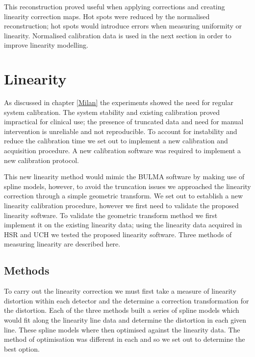 This reconstruction proved useful when applying corrections and creating linearity correction maps. Hot spots were reduced by the normalised reconstruction; hot spots would introduce errors when measuring uniformity or linearity. Normalised calibration data is used in the next section in order to improve linearity modelling.

\section{Linearity}
As discussed in chapter \ref{Milan} the experiments showed the need for regular system calibration. The system stability and existing calibration proved impractical for clinical use; the presence of truncated data and need for manual intervention is unreliable and not reproducible. To account for instability and reduce the calibration time we set out to implement a new calibration and acquisition procedure. A new calibration software was required to implement a new calibration protocol.

This new linearity method would mimic the BULMA software by making use of spline models, however, to avoid the truncation issues we approached the linearity correction through a simple geometric transform. We set out to establish a new linearity calibration procedure, however we first need to validate the proposed linearity software. To validate the geometric transform method we first implement it on the existing linearity data; using the linearity data acquired in \acrshort{HSR} and \acrshort{UCH} we tested the proposed linearity software. Three methods of measuring linearity are described here. 
\subsection{Methods}
To carry out the linearity correction we must first take a measure of linearity distortion within each detector and the determine a correction transformation for the distortion. Each of the three methods built a series of spline models which would fit along the linearity line data and determine the distortion in each given line. These spline models where then optimised against the linearity data. The method of optimisation was different in each and so we set out to determine the best option. 

